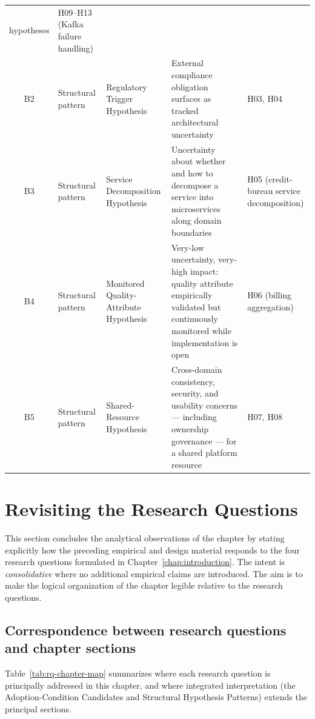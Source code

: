 \begin{table}[htbp]
\begin{tabular}{clp{3.6cm}p{5.2cm}p{2.6cm}}
     hypotheses
   & H09--H13 (Kafka failure handling) \\
B2 & Structural pattern & Regulatory Trigger Hypothesis
   & External compliance obligation surfaces as tracked architectural
     uncertainty
   & H03, H04 \\
B3 & Structural pattern & Service Decomposition Hypothesis
   & Uncertainty about whether and how to decompose a service into microservices
     along domain boundaries
   & H05 (credit-bureau service decomposition) \\
B4 & Structural pattern & Monitored Quality-Attribute Hypothesis
   & Very-low uncertainty, very-high impact: quality attribute empirically
     validated but continuously monitored while implementation is open
   & H06 (billing aggregation) \\
B5 & Structural pattern & Shared-Resource Hypothesis
   & Cross-domain consistency, security, and usability concerns --- including
     ownership governance --- for a shared platform resource
   & H07, H08 \\
\bottomrule
\end{tabular}
\end{table}

\section{Revisiting the Research Questions}
\label{sec:rq-revisit}

This section concludes the analytical observations of the chapter by stating explicitly how
the preceding empirical and design material responds to the four research questions
formulated in Chapter~\ref{chap:introduction}. The intent is \emph{consolidative} where
no additional empirical claims are introduced. The aim is to make the logical
organization of the chapter legible relative to the research questions.

\subsection{Correspondence between research questions and chapter sections}

Table~\ref{tab:rq-chapter-map} summarizes where each research question is principally
addressed in this chapter, and where integrated interpretation (the
Adoption-Condition Candidates and Structural Hypothesis Patterns) extends
the principal sections.

